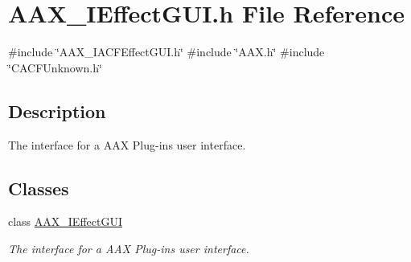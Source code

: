 \hypertarget{a00596}{}\section{A\+A\+X\+\_\+\+I\+Effect\+G\+U\+I.\+h File Reference}
\label{a00596}
{\ttfamily \#include \char`\"{}A\+A\+X\+\_\+\+I\+A\+C\+F\+Effect\+G\+U\+I.\+h\char`\"{}}\newline
{\ttfamily \#include \char`\"{}A\+A\+X.\+h\char`\"{}}\newline
{\ttfamily \#include \char`\"{}C\+A\+C\+F\+Unknown.\+h\char`\"{}}\newline


\subsection{Description}
The interface for a A\+AX Plug-\/in\textquotesingle{}s user interface. 

\subsection*{Classes}
\begin{DoxyCompactItemize}
\item 
class \mbox{\hyperlink{a01821}{A\+A\+X\+\_\+\+I\+Effect\+G\+UI}}
\begin{DoxyCompactList}\small\item\em The interface for a A\+AX Plug-\/in\textquotesingle{}s user interface. \end{DoxyCompactList}\end{DoxyCompactItemize}
